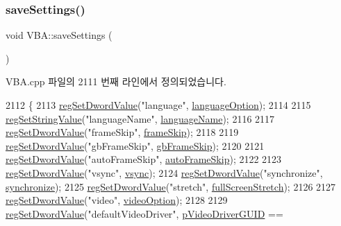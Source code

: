 \subsubsection{\texorpdfstring{save\+Settings()}{saveSettings()}}
{\footnotesize\ttfamily void V\+B\+A\+::save\+Settings (\begin{DoxyParamCaption}{ }\end{DoxyParamCaption})}



V\+B\+A.\+cpp 파일의 2111 번째 라인에서 정의되었습니다.


\begin{DoxyCode}
2112 \{
2113   \mbox{\hyperlink{_reg_8cpp_a758e775489a3fb5c3cc7071fdd5af87e}{regSetDwordValue}}(\textcolor{stringliteral}{"language"}, \mbox{\hyperlink{class_v_b_a_ac747a07ec2db4bcddea1b4581ebe5c6b}{languageOption}});
2114 
2115   \mbox{\hyperlink{_reg_8cpp_a37fa244e34332f058ba14f206dc7e0ea}{regSetStringValue}}(\textcolor{stringliteral}{"languageName"}, \mbox{\hyperlink{class_v_b_a_a9763c257edcdac0bff2b0ecab70ffc80}{languageName}});
2116   
2117   \mbox{\hyperlink{_reg_8cpp_a758e775489a3fb5c3cc7071fdd5af87e}{regSetDwordValue}}(\textcolor{stringliteral}{"frameSkip"}, \mbox{\hyperlink{_globals_8cpp_a668e22999d7fcea3ed14130fd680b795}{frameSkip}});
2118 
2119   \mbox{\hyperlink{_reg_8cpp_a758e775489a3fb5c3cc7071fdd5af87e}{regSetDwordValue}}(\textcolor{stringliteral}{"gbFrameSkip"}, \mbox{\hyperlink{_g_b_8cpp_a2139360d32d74969f470ef05414ecaf8}{gbFrameSkip}});
2120 
2121   \mbox{\hyperlink{_reg_8cpp_a758e775489a3fb5c3cc7071fdd5af87e}{regSetDwordValue}}(\textcolor{stringliteral}{"autoFrameSkip"}, \mbox{\hyperlink{class_v_b_a_a9ecbee7d82db73b24aee3afb66128388}{autoFrameSkip}});
2122   
2123   \mbox{\hyperlink{_reg_8cpp_a758e775489a3fb5c3cc7071fdd5af87e}{regSetDwordValue}}(\textcolor{stringliteral}{"vsync"}, \mbox{\hyperlink{class_v_b_a_a84075b77df64f3dc2100159064b79fba}{vsync}});
2124   \mbox{\hyperlink{_reg_8cpp_a758e775489a3fb5c3cc7071fdd5af87e}{regSetDwordValue}}(\textcolor{stringliteral}{"synchronize"}, \mbox{\hyperlink{_globals_8cpp_ac7839c270877c700179f026cb3217a6b}{synchronize}});
2125   \mbox{\hyperlink{_reg_8cpp_a758e775489a3fb5c3cc7071fdd5af87e}{regSetDwordValue}}(\textcolor{stringliteral}{"stretch"}, \mbox{\hyperlink{class_v_b_a_a00bd5b85110bd763ad39eb4a9fb403a1}{fullScreenStretch}});
2126 
2127   \mbox{\hyperlink{_reg_8cpp_a758e775489a3fb5c3cc7071fdd5af87e}{regSetDwordValue}}(\textcolor{stringliteral}{"video"}, \mbox{\hyperlink{class_v_b_a_a17dac073149c897f770c00ed7098ad32}{videoOption}});
2128 
2129   \mbox{\hyperlink{_reg_8cpp_a758e775489a3fb5c3cc7071fdd5af87e}{regSetDwordValue}}(\textcolor{stringliteral}{"defaultVideoDriver"}, \mbox{\hyperlink{class_v_b_a_a457e9b79d010d5ece39a37a2e73bde90}{pVideoDriverGUID}} == 

\end{DoxyCode}

